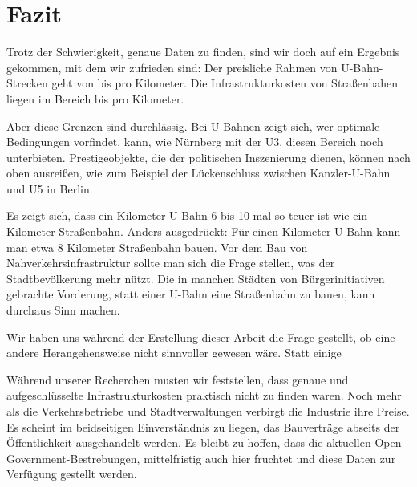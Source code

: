 \chapter{Fazit}




Trotz der Schwierigkeit, genaue Daten zu finden, sind wir doch auf ein Ergebnis gekommen, mit dem wir zufrieden sind: Der preisliche Rahmen von U-Bahn-Strecken geht von  bis  pro Kilometer. Die Infrastrukturkosten von Straßenbahen liegen im Bereich  bis  pro Kilometer.

Aber diese Grenzen sind durchlässig. Bei U-Bahnen zeigt sich, wer optimale Bedingungen vorfindet, kann, wie Nürnberg mit der U3, diesen Bereich noch unterbieten. Prestigeobjekte, die der politischen Inszenierung dienen, können nach oben ausreißen, wie zum Beispiel der Lückenschluss zwischen Kanzler-U-Bahn und U5 in Berlin. 

Es zeigt sich, dass ein Kilometer U-Bahn 6 bis 10 mal so teuer ist wie ein Kilometer Straßenbahn. Anders ausgedrückt: Für einen Kilometer U-Bahn kann man etwa 8 Kilometer Straßenbahn bauen. Vor dem Bau von Nahverkehrsinfrastruktur sollte man sich die Frage stellen, was der Stadtbevölkerung mehr nützt. Die in manchen Städten von Bürgerinitiativen gebrachte Vorderung, statt einer U-Bahn eine Straßenbahn zu bauen\cite{fzNb}, kann durchaus Sinn machen.

Wir haben uns während der Erstellung dieser Arbeit die Frage gestellt, ob eine andere Herangehensweise nicht sinnvoller gewesen wäre. Statt einige 

Während unserer Recherchen musten wir feststellen, dass genaue und aufgeschlüsselte Infrastrukturkosten praktisch nicht zu finden waren. Noch mehr als die Verkehrsbetriebe und Stadtverwaltungen verbirgt die Industrie ihre Preise. Es scheint im beidseitigen Einverständnis zu liegen, das Bauverträge abseits der Öffentlichkeit ausgehandelt werden. Es bleibt zu hoffen, dass die aktuellen Open-Government-Bestrebungen, mittelfristig auch hier fruchtet und diese Daten zur Verfügung gestellt werden. 
